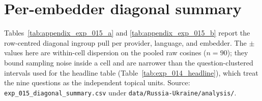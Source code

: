 \section{Per-embedder diagonal summary}\label{sec:appendix_exp_015_table}

Tables~\ref{tab:appendix_exp_015_a} and
\ref{tab:appendix_exp_015_b} report the row-centred diagonal
ingroup pull per provider, language, and embedder. The $\pm$
values here are within-cell dispersion on the pooled raw cosines
($n{=}90$); they bound sampling noise inside a cell and are
narrower than the question-clustered intervals used for the
headline table (Table~\ref{tab:exp_014_headline}), which treat the
nine questions as the independent topical units. Source:
\verb|exp_015_diagonal_summary.csv| under
\verb|data/Russia-Ukraine/analysis/|.

